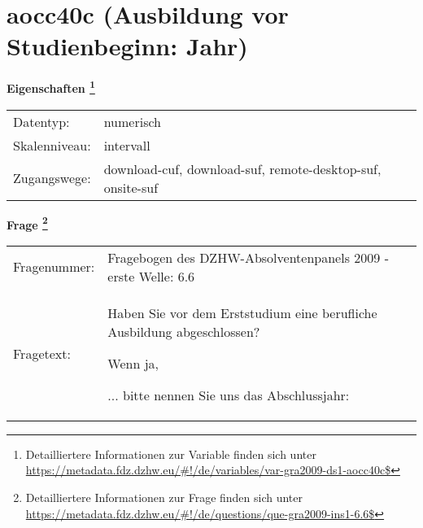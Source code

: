 
    \setcounter{footnote}{0}

    \vspace*{-1.8cm}
	\section{aocc40c (Ausbildung vor Studienbeginn: Jahr)}
	\label{section:aocc40c}



    \vspace*{0.5cm}
    \noindent\textbf{Eigenschaften
	\footnote{Detailliertere Informationen zur Variable finden sich unter
		\url{https://metadata.fdz.dzhw.eu/\#!/de/variables/var-gra2009-ds1-aocc40c$}}}\\
	\begin{tabularx}{\hsize}{@{}lX}
	Datentyp: & numerisch \\
	Skalenniveau: & intervall \\
	Zugangswege: &
	  download-cuf, 
	  download-suf, 
	  remote-desktop-suf, 
	  onsite-suf
 \\
    \end{tabularx}



				\vspace*{0.5cm}
                \noindent\textbf{Frage
	                \footnote{Detailliertere Informationen zur Frage finden sich unter
		              \url{https://metadata.fdz.dzhw.eu/\#!/de/questions/que-gra2009-ins1-6.6$}}}\\
				\begin{tabularx}{\hsize}{@{}lX}
					Fragenummer: &
					  Fragebogen des DZHW-Absolventenpanels 2009 - erste Welle:
					  6.6
 \\
					Fragetext: & Haben Sie vor dem Erststudium eine berufliche Ausbildung abgeschlossen?\par  Wenn ja,\par  ... bitte nennen Sie uns das Abschlussjahr: \\
				\end{tabularx}





